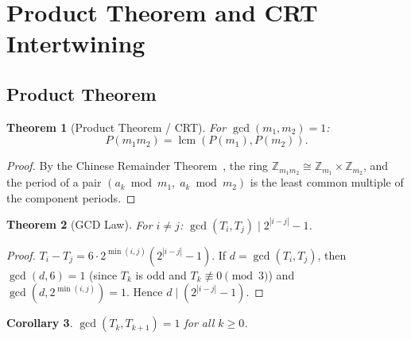 \documentclass[11pt, a4paper]{article}
\theoremstyle{plain}
\newtheorem{theorem}{Theorem}[section]
\newtheorem{corollary}[theorem]{Corollary}
\theoremstyle{definition}
\theoremstyle{remark}
\DeclareMathOperator{\lcm}{lcm}
\begin{document}
\section{Product Theorem and CRT Intertwining}\label{sec:crt}

\subsection{Product Theorem}

\begin{theorem}[Product Theorem / CRT]\label{thm:product}
For $\gcd(m_1, m_2) = 1$:
\[
  P(m_1 m_2) = \lcm(P(m_1), P(m_2)).
\]
\end{theorem}

\begin{proof}
By the Chinese Remainder Theorem~\cite{ireland}, the ring
$\mathbb{Z}_{m_1 m_2} \cong \mathbb{Z}_{m_1} \times \mathbb{Z}_{m_2}$,
and the period of a pair $(a_k \bmod m_1,\; a_k \bmod m_2)$ is the
least common multiple of the component periods.
\end{proof}

\begin{theorem}[GCD Law]\label{thm:gcd}
For $i \neq j$: $\gcd(T_i, T_j) \mid 2^{|i-j|} - 1$.
\end{theorem}

\begin{proof}
$T_i - T_j = 6 \cdot 2^{\min(i,j)}(2^{|i-j|} - 1)$.
If $d = \gcd(T_i, T_j)$, then $\gcd(d, 6) = 1$ (since $T_k$ is odd
and $T_k \not\equiv 0 \pmod{3}$) and $\gcd(d, 2^{\min(i,j)}) = 1$.
Hence $d \mid (2^{|i-j|} - 1)$.
\end{proof}

\begin{corollary}\label{cor:coprime}
$\gcd(T_k, T_{k+1}) = 1$ for all $k \geq 0$.
\end{corollary}
\end{document}
